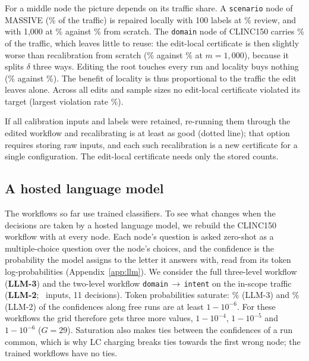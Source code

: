 For a middle node the picture depends on its traffic share. A \texttt{scenario} node of
MASSIVE (\EditShareMMiddle\% of the traffic) is repaired locally with 100 labels at
\EditMMiddleLocalHundred\% review, and with 1{,}000 at \EditMMiddleLocalThousand\% against
\EditMMiddleScratchLCThousand\% from scratch. The \texttt{domain} node of CLINC150 carries
\EditShareCMiddle\% of the traffic, which leaves little to reuse: the edit-local certificate
is then slightly worse than recalibration from scratch (\EditCMiddleLocalThousand\% against
\EditCMiddleScratchLCThousand\% at $m=1{,}000$), because it splits $\delta$ three ways.
Editing the root touches every run and locality buys nothing (\EditCRootLocalThousand\% against
\EditCRootScratchLCThousand\%). The benefit of locality is thus proportional to the traffic
the edit leaves alone. Across all edits and sample sizes no edit-local certificate violated
its target (largest violation rate \EditMaxViolLocal\%).

If all calibration inputs and labels were retained, re-running them through the edited
workflow and recalibrating is at least as good (dotted line); that option requires storing
raw inputs, and each such recalibration is a new certificate for a single configuration. The
edit-local certificate needs only the stored counts.

\subsection{A hosted language model}\label{sec:exp-llm}

The workflows so far use trained classifiers. To see what changes when the decisions are
taken by a hosted language model, we rebuild the CLINC150 workflow with
\texttt{\LlmModel} at every node. Each node's question is asked zero-shot as a
multiple-choice question over the node's choices, and the confidence is the probability the
model assigns to the letter it answers with, read from its token log-probabilities
(Appendix~\ref{app:llm}). We consider the full three-level workflow (\textbf{LLM-3}) and the
two-level workflow \texttt{domain}\,$\to$\,\texttt{intent} on the in-scope traffic
(\textbf{LLM-2}; \LlmSizeL\ inputs, 11 decisions). Token probabilities saturate:
\LlmSaturatedT\% (LLM-3) and \LlmSaturatedL\% (LLM-2) of the confidences along free runs are
at least $1-10^{-6}$. For these workflows the grid therefore gets three more values,
$1-10^{-4}$, $1-10^{-5}$ and $1-10^{-6}$ ($G=29$). Saturation also makes ties between the
confidences of a run common, which is why LC charging breaks ties towards the first wrong
node; the trained workflows have no ties.

